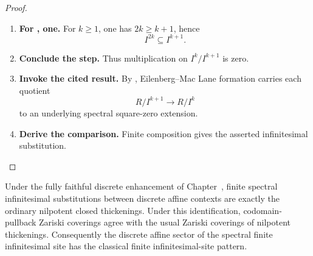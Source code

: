 \begin{proof}
\leavevmode
\begin{enumerate}[label=\textup{(\arabic*)}]
    \item \textbf{For , one.}
    For \(k\geq1\), one has \(2k\geq k+1\), hence
    \[
        I^{2k}\subseteq I^{k+1}.
    \]

    \item \textbf{Conclude the step.}
    Thus multiplication on \(I^k/I^{k+1}\) is zero.

    \item \textbf{Invoke the cited result.}
    By , Eilenberg--Mac Lane formation carries each
    quotient
    \[
        R/I^{k+1}\longrightarrow R/I^k
    \]
    to an underlying spectral square-zero extension.

    \item \textbf{Derive the comparison.}
    Finite composition gives the asserted infinitesimal substitution.
\end{enumerate}
\end{proof}

\begin{theorem}
\label{thm:discrete-finite-infinitesimal-comparison}
Under the fully faithful discrete enhancement of
Chapter~, finite spectral infinitesimal
substitutions between discrete affine contexts are exactly the ordinary
nilpotent closed thickenings. Under this identification, codomain-pullback
Zariski coverings agree with the usual Zariski coverings of nilpotent
thickenings. Consequently the discrete affine sector of the spectral finite
infinitesimal site has the classical finite infinitesimal-site pattern.
\end{theorem}

